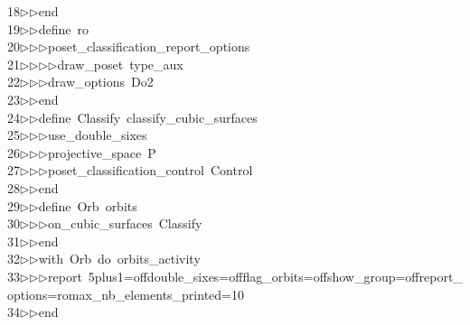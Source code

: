 \begin{tabbing}
18\>$\triangleright$\>$\triangleright$\>end\ \\[0pt]
19\>$\triangleright$\>$\triangleright$\>define\ ro\ \\[0pt]
20\>$\triangleright$\>$\triangleright$\>$\triangleright$\>poset\_classification\_report\_options\ \\[0pt]
21\>$\triangleright$\>$\triangleright$\>$\triangleright$\>$\triangleright$\>draw\_poset\ type\_aux\ \\[0pt]
22\>$\triangleright$\>$\triangleright$\>$\triangleright$\>draw\_options\ Do2\ \\[0pt]
23\>$\triangleright$\>$\triangleright$\>end\ \\[0pt]
24\>$\triangleright$\>$\triangleright$\>define\ Classify\ classify\_cubic\_surfaces\ \\[0pt]
25\>$\triangleright$\>$\triangleright$\>$\triangleright$\>use\_double\_sixes\ \\[0pt]
26\>$\triangleright$\>$\triangleright$\>$\triangleright$\>projective\_space\ P\ \\[0pt]
27\>$\triangleright$\>$\triangleright$\>$\triangleright$\>poset\_classification\_control\ Control\ \\[0pt]
28\>$\triangleright$\>$\triangleright$\>end\ \\[0pt]
29\>$\triangleright$\>$\triangleright$\>define\ Orb\ orbits\ \\[0pt]
30\>$\triangleright$\>$\triangleright$\>$\triangleright$\>on\_cubic\_surfaces\ Classify\ \\[0pt]
31\>$\triangleright$\>$\triangleright$\>end\ \\[0pt]
32\>$\triangleright$\>$\triangleright$\>with\ Orb\ do\ orbits\_activity\ \\[0pt]
33\>$\triangleright$\>$\triangleright$\>$\triangleright$\>report\ 5plus1=offdouble\_sixes=offflag\_orbits=offshow\_group=offreport\_\\[0pt]
\>options=romax\_nb\_elements\_printed=10\ \\[0pt]
34\>$\triangleright$\>$\triangleright$\>end\ \\[0pt]

\end{tabbing}
